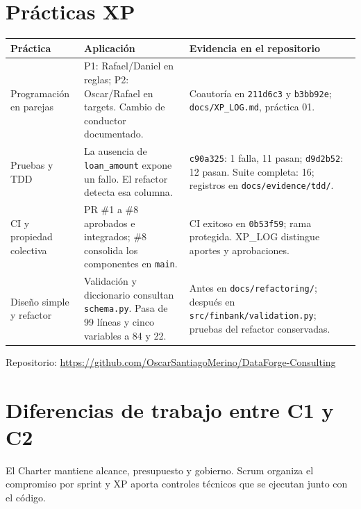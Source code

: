 \documentclass[10pt,a4paper]{article}
\newcommand{\repourl}{https://github.com/OscarSantiagoMerino/DataForge-Consulting}
\begin{document}
\section{Prácticas XP}
{\footnotesize
\begin{tabularx}{\linewidth}{@{}l L L@{}}
\toprule
Práctica & Aplicación & Evidencia en el repositorio \\
\midrule
Programación en parejas & P1: Rafael/Daniel en reglas; P2: Oscar/Rafael en targets. Cambio de conductor documentado. & Coautoría en \texttt{211d6c3} y \texttt{b3bb92e}; \texttt{docs/XP\_LOG.md}, práctica 01. \\
Pruebas y TDD & La ausencia de \texttt{loan\_amount} expone un fallo. El refactor detecta esa columna. & \texttt{c90a325}: 1 falla, 11 pasan; \texttt{d9d2b52}: 12 pasan. Suite completa: 16; registros en \texttt{docs/evidence/tdd/}. \\
CI y propiedad colectiva & PR \#1 a \#8 aprobados e integrados; \#8 consolida los componentes en \texttt{main}. & CI exitoso en \texttt{0b53f59}; rama protegida. XP\_LOG distingue aportes y aprobaciones. \\
Diseño simple y refactor & Validación y diccionario consultan \texttt{schema.py}. Pasa de 99 líneas y cinco variables a 84 y 22. & Antes en \texttt{docs/refactoring/}; después en \texttt{src/finbank/validation.py}; pruebas del refactor conservadas. \\
\bottomrule
\end{tabularx}}

Repositorio: \url{\repourl}

\section{Diferencias de trabajo entre C1 y C2}
El Charter mantiene alcance, presupuesto y gobierno. Scrum organiza el compromiso por sprint y XP aporta
controles técnicos que se ejecutan junto con el código.
\end{document}
